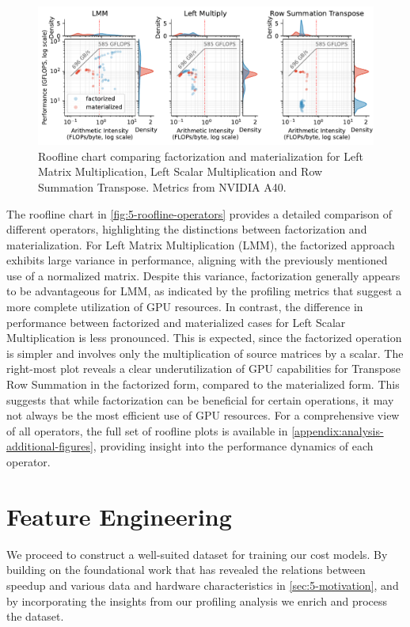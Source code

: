 \begin{figure}[ht]
  \centering
  \includegraphics[width=\linewidth]{chapters/05_cost_estimation/figures/roofline-operators.pdf}
  \caption[Roofline chart per operator]{Roofline chart comparing factorization and materialization for Left Matrix Multiplication, Left Scalar Multiplication and Row Summation Transpose. Metrics from NVIDIA A40.}
  \label{fig:5-roofline-operators}
\end{figure}

The roofline chart in \autoref{fig:5-roofline-operators} provides a detailed comparison of different operators, highlighting the distinctions between factorization and materialization. For Left Matrix Multiplication (LMM), the factorized approach exhibits large variance in performance, aligning with the previously mentioned use of a normalized matrix. Despite this variance, factorization generally appears to be advantageous for LMM, as indicated by the profiling metrics that suggest a more complete utilization of GPU resources. In contrast, the difference in performance between factorized and materialized cases for Left Scalar Multiplication is less pronounced. This is expected, since the factorized operation is simpler and involves only the multiplication of source matrices by a scalar. The right-most plot reveals a clear underutilization of GPU capabilities for Transpose Row Summation in the factorized form, compared to the materialized form. This suggests that while factorization can be beneficial for certain operations, it may not always be the most efficient use of GPU resources. For a comprehensive view of all operators, the full set of roofline plots is available in \autoref{appendix:analysis-additional-figures}, providing insight into the performance dynamics of each operator.

\section{Feature Engineering}
\label{sec:5-feature-engineering}
We proceed to construct a well-suited dataset for training our cost models. By building on the foundational work that has revealed the relations between speedup and various data and hardware characteristics in \autoref{sec:5-motivation}, and by incorporating the insights from our profiling analysis we enrich and process the dataset.

